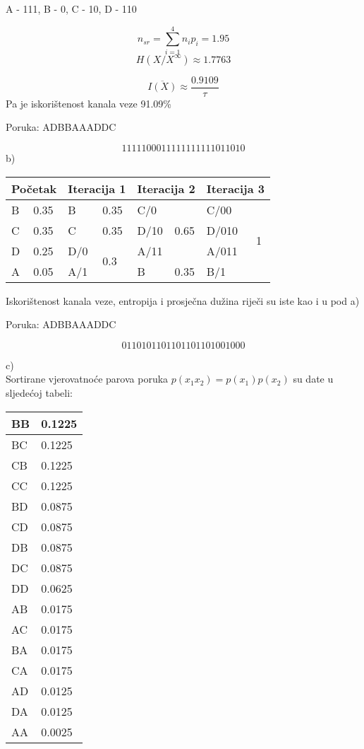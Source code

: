 \documentclass[12pt]{article}
\begin{document}
A - 111, B - 0, C - 10, D - 110

$$n_{sr} = \sum_{i = 1}^{4}n_i p_i = 1.95$$
$$H(X/X^{\infty}) \approx 1.7763$$

$$\overline{I(X)} \approx \frac{0.9109}{\tau}$$
Pa je iskorištenost kanala veze 91.09\%

Poruka: ADBBAAADDC

$$1111100011111111111011010$$
\newpage
b)\\


\begin{table}[hp]
\centering
\begin{tabular}{|l|l|l|l|l|l|l|l|}
\hline
\multicolumn{2}{|l|}{Početak} & \multicolumn{2}{l|}{Iteracija 1} & \multicolumn{2}{l|}{Iteracija 2} & \multicolumn{2}{l|}{Iteracija 3} \\ \hline
B & 0.35 & B & 0.35 & C/0 & \multirow{3}{*}{0.65} & C/00 & \multirow{4}{*}{1} \\ \cline{1-4}
C & 0.35 & C & 0.35 & D/10 &  & D/010 &  \\ \cline{1-4}
D & 0.25 & D/0 & \multirow{2}{*}{0.3} & A/11 &  & A/011 &  \\ \cline{1-2} \cline{5-6}
A & 0.05 & A/1 &  & B & 0.35 & B/1 &  \\ \hline
\end{tabular}
\end{table}

Iskorištenost kanala veze, entropija i prosječna dužina riječi su iste kao i u pod a)

Poruka: ADBBAAADDC

$$0110101101101101101001000$$

\newpage
c)\\

Sortirane vjerovatnoće parova poruka $p(x_1 x_2) = p(x_1) p(x_2)$ su date u sljedećoj tabeli:

\begin{table}[hp]
\centering
\begin{tabular}{|l|l|}
\hline
BB & 0.1225 \\ \hline
BC & 0.1225 \\ \hline
CB & 0.1225 \\ \hline
CC & 0.1225 \\ \hline
BD & 0.0875 \\ \hline
CD & 0.0875 \\ \hline
DB & 0.0875 \\ \hline
DC & 0.0875 \\ \hline
DD & 0.0625 \\ \hline
AB & 0.0175 \\ \hline
AC & 0.0175 \\ \hline
BA & 0.0175 \\ \hline
CA & 0.0175 \\ \hline
AD & 0.0125 \\ \hline
DA & 0.0125 \\ \hline
AA & 0.0025 \\ \hline
\end{tabular}
\end{table}
\end{document}
